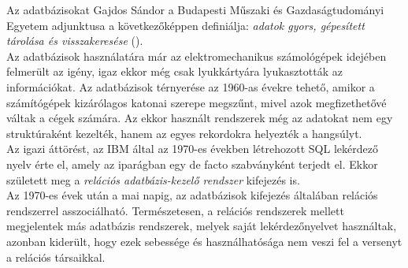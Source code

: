 Az adatbázisokat Gajdos Sándor a Budapesti Műszaki és Gazdaságtudományi Egyetem adjunktusa a következőképpen definiálja: \emph{adatok gyors, gépesített tárolása és visszakeresése} ().\\
Az adatbázisok használatára már az elektromechanikus számológépek idejében felmerült az igény, igaz ekkor még csak lyukkártyára lyukasztották az információkat. Az adatbázisok térnyerése az 1960-as évekre tehető, amikor a számítógépek kizárólagos katonai szerepe megszűnt, mivel azok megfizethetővé váltak a cégek számára. Az ekkor használt rendszerek még az adatokat nem egy struktúraként kezelték, hanem az egyes rekordokra helyezték a hangsúlyt.
\\
Az igazi áttörést, az IBM által  az 1970-es években létrehozott SQL lekérdező nyelv érte el, amely az iparágban egy de facto szabványként terjedt el. Ekkor született meg a \emph{relációs adatbázis-kezelő rendszer} kifejezés is.
\\
Az 1970-es évek után a mai napig, az adatbázisok kifejezés általában relációs rendszerrel asszociálható. Természetesen, a relációs rendszerek mellett megjelentek más adatbázis rendszerek, melyek saját lekérdezőnyelvet használtak, azonban kiderült, hogy ezek sebessége és használhatósága nem veszi fel a versenyt a relációs társaikkal.

